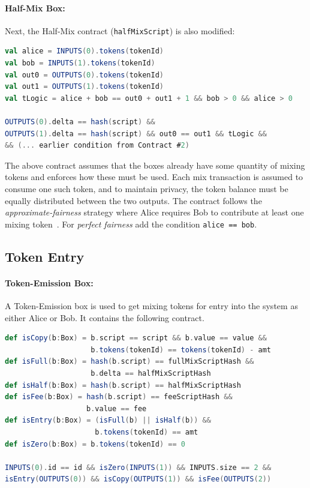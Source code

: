\documentclass[runningheads]{llncs}
\begin{document}
\paragraph{Half-Mix Box:}
Next, the Half-Mix contract (\texttt{halfMixScript}) is also modified:
\begin{lstlisting}[language=Scala,caption={Half mix script with confinement},label=halfMixScriptWithConfinement]
val alice = INPUTS(0).tokens(tokenId)
val bob = INPUTS(1).tokens(tokenId)
val out0 = OUTPUTS(0).tokens(tokenId)
val out1 = OUTPUTS(1).tokens(tokenId)
val tLogic = alice + bob == out0 + out1 + 1 && bob > 0 && alice > 0 
  
OUTPUTS(0).delta == hash(script) && 
OUTPUTS(1).delta == hash(script) && out0 == out1 && tLogic &&
&& (... earlier condition from Contract #2)
\end{lstlisting}

The above contract assumes that the boxes already have some quantity of mixing tokens and enforces how these must be used. Each mix transaction is assumed to consume one such token, and to maintain privacy, the token balance must be equally distributed between the two outputs. The contract follows the {\em approximate-fairness} strategy where Alice requires Bob to contribute at least one mixing token~\cite{advtutorial}. For {\em perfect fairness} add the condition \texttt{alice == bob}. 

\subsection{Token Entry}

\paragraph{Token-Emission Box:} A Token-Emission box is used to get mixing tokens for entry into the system as either Alice or Bob. It contains the following contract. 

\begin{lstlisting}[language=Scala,caption={Token emission script},label=tokenEmissionScript]
def isCopy(b:Box) = b.script == script && b.value == value &&
                    b.tokens(tokenId) == tokens(tokenId) - amt
def isFull(b:Box) = hash(b.script) == fullMixScriptHash && 
                    b.delta == halfMixScriptHash
def isHalf(b:Box) = hash(b.script) == halfMixScriptHash
def isFee(b:Box) = hash(b.script) == feeScriptHash &&
                   b.value == fee
def isEntry(b:Box) = (isFull(b) || isHalf(b)) && 
                     b.tokens(tokenId) == amt
def isZero(b:Box) = b.tokens(tokenId) == 0

INPUTS(0).id == id && isZero(INPUTS(1)) && INPUTS.size == 2 &&
isEntry(OUTPUTS(0)) && isCopy(OUTPUTS(1)) && isFee(OUTPUTS(2))
\end{lstlisting}
\end{document}

